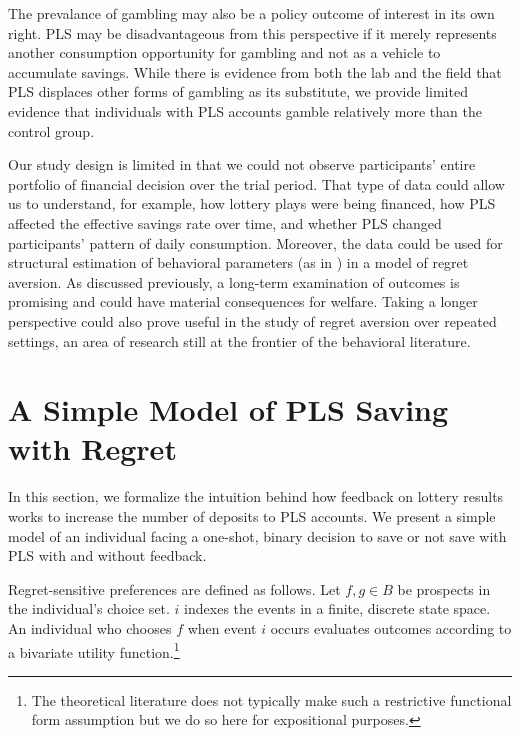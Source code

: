 \documentclass[11pt]{article}
\begin{document}
	The prevalance of gambling may also be a policy outcome of interest in its own right. PLS may be disadvantageous from this perspective if it merely represents another consumption opportunity for gambling and not as a vehicle to accumulate savings. While there is evidence from both the lab and the field that PLS displaces other forms of gambling as its substitute, we provide limited evidence that individuals with PLS accounts gamble relatively more than the control group. 

	Our study design is limited in that we could not observe participants' entire portfolio of financial decision over the trial period. That type of data could allow us to understand, for example, how lottery plays were being financed, how PLS affected the effective savings rate over time, and whether PLS changed participants' pattern of daily consumption. Moreover, the data could be used for structural estimation of behavioral parameters (as in \textcite{filiz-ozbay_lottery_2015}) in a model of regret aversion. As discussed previously, a long-term examination of outcomes is promising and could have material consequences for welfare. Taking a longer perspective could also prove useful in the study of regret aversion over repeated settings, an area of research still at the frontier of the behavioral literature.

	\clearpage

\newpage

\printbibliography

\newpage

\appendix

\section{A Simple Model of PLS Saving with Regret} \label{sec:model}

	In this section, we formalize the intuition behind how feedback on lottery results works to increase the number of deposits to PLS accounts. We present a simple model of an individual facing a one-shot, binary decision to save or not save with PLS with and without feedback.

	Regret-sensitive preferences are defined as follows. Let $f, g \in B$ be prospects in the individual's choice set. $i$ indexes the events in a finite, discrete state space. An individual who chooses $f$ when event $i$ occurs evaluates outcomes according to a bivariate utility function.\footnote{The theoretical literature does not typically make such a restrictive functional form assumption but we do so here for expositional purposes.}
\end{document}

